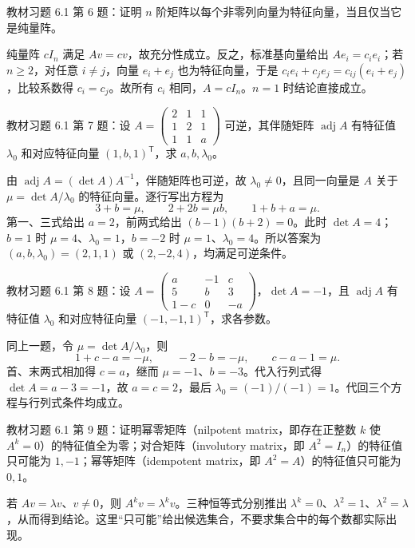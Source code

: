 \begin{example}
\label{ex:xie-61-06}
教材习题 6.1 第 6 题：证明 $n$ 阶矩阵以每个非零列向量为特征向量，当且仅当它是纯量阵。
\end{example}
\begin{solve}
纯量阵 $cI_n$ 满足 $Av=cv$，故充分性成立。反之，标准基向量给出 $Ae_i=c_ie_i$；若 $n\geq2$，对任意 $i\ne j$，向量 $e_i+e_j$ 也为特征向量，于是 $c_ie_i+c_je_j=c_{ij}(e_i+e_j)$，比较系数得 $c_i=c_j$。故所有 $c_i$ 相同，$A=cI_n$。$n=1$ 时结论直接成立。
\end{solve}

\begin{example}
\label{ex:xie-61-07}
教材习题 6.1 第 7 题：设 $A=\begin{pmatrix}2&1&1\\1&2&1\\1&1&a\end{pmatrix}$ 可逆，其伴随矩阵 $\operatorname{adj}A$ 有特征值 $\lambda_0$ 和对应特征向量 $(1,b,1)^{\mathsf T}$，求 $a,b,\lambda_0$。
\end{example}
\begin{solve}
由 $\operatorname{adj}A=(\det A)A^{-1}$，伴随矩阵也可逆，故 $\lambda_0\ne0$，且同一向量是 $A$ 关于 $\mu=\det A/\lambda_0$ 的特征向量。逐行写出方程为
\[
 3+b=\mu,\qquad 2+2b=\mu b,\qquad 1+b+a=\mu.
\]
第一、三式给出 $a=2$，前两式给出 $(b-1)(b+2)=0$。此时 $\det A=4$；$b=1$ 时 $\mu=4$、$\lambda_0=1$，$b=-2$ 时 $\mu=1$、$\lambda_0=4$。所以答案为 $(a,b,\lambda_0)=(2,1,1)$ 或 $(2,-2,4)$，均满足可逆条件。
\end{solve}

\begin{example}
\label{ex:xie-61-08}
教材习题 6.1 第 8 题：设 $A=\begin{pmatrix}a&-1&c\\5&b&3\\1-c&0&-a\end{pmatrix}$，$\det A=-1$，且 $\operatorname{adj}A$ 有特征值 $\lambda_0$ 和对应特征向量 $(-1,-1,1)^{\mathsf T}$，求各参数。
\end{example}
\begin{solve}
同上一题，令 $\mu=\det A/\lambda_0$，则
\[
 1+c-a=-\mu,\qquad -2-b=-\mu,\qquad c-a-1=\mu.
\]
首、末两式相加得 $c=a$，继而 $\mu=-1$、$b=-3$。代入行列式得 $\det A=a-3=-1$，故 $a=c=2$，最后 $\lambda_0=(-1)/(-1)=1$。代回三个方程与行列式条件均成立。
\end{solve}

\begin{example}
\label{ex:xie-61-09}
教材习题 6.1 第 9 题：证明幂零矩阵（nilpotent matrix，即存在正整数 $k$ 使 $A^k=0$）的特征值全为零；对合矩阵（involutory matrix，即 $A^2=I_n$）的特征值只可能为 $1,-1$；幂等矩阵（idempotent matrix，即 $A^2=A$）的特征值只可能为 $0,1$。
\end{example}
\begin{solve}
若 $Av=\lambda v$、$v\ne0$，则 $A^kv=\lambda^kv$。三种恒等式分别推出 $\lambda^k=0$、$\lambda^2=1$、$\lambda^2=\lambda$，从而得到结论。这里“只可能”给出候选集合，不要求集合中的每个数都实际出现。
\end{solve}

